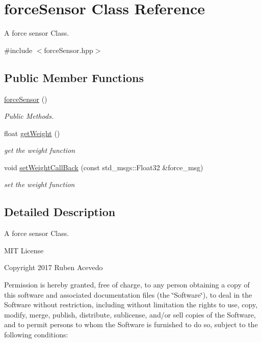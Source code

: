 \hypertarget{classforceSensor}{}\section{force\+Sensor Class Reference}
\label{classforceSensor}


A force sensor Class.  




{\ttfamily \#include $<$force\+Sensor.\+hpp$>$}

\subsection*{Public Member Functions}
\begin{DoxyCompactItemize}
\item 
\hyperlink{classforceSensor_a3551d62022f49183d58590f22a110908}{force\+Sensor} ()
\begin{DoxyCompactList}\small\item\em Public Methods. \end{DoxyCompactList}\item 
float \hyperlink{classforceSensor_abb1fb6c8888399dde382af45962fb8d6}{get\+Weight} ()
\begin{DoxyCompactList}\small\item\em get the weight function \end{DoxyCompactList}\item 
void \hyperlink{classforceSensor_a801613e7da1697c527f208a9f09f8c90}{set\+Weight\+Call\+Back} (const std\+\_\+msgs\+::\+Float32 \&force\+\_\+msg)
\begin{DoxyCompactList}\small\item\em set the weight function \end{DoxyCompactList}\end{DoxyCompactItemize}


\subsection{Detailed Description}
A force sensor Class. 

M\+IT License

Copyright 2017 Ruben Acevedo

Permission is hereby granted, free of charge, to any person obtaining a copy of this software and associated documentation files (the \char`\"{}\+Software\char`\"{}), to deal in the Software without restriction, including without limitation the rights to use, copy, modify, merge, publish, distribute, sublicense, and/or sell copies of the Software, and to permit persons to whom the Software is furnished to do so, subject to the following conditions\+:

